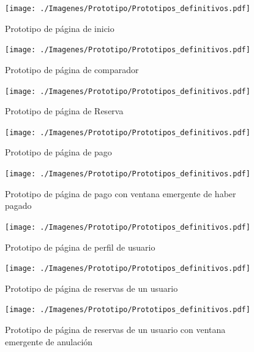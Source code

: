 \begin{figure}[H]
    \centering
    \texttt{[image: ./Imagenes/Prototipo/Prototipos\_definitivos.pdf]}
    \label{fig:prot_inicio}
    \caption{Prototipo de página de inicio}
\end{figure}

\begin{figure}[H]
    \centering
    \texttt{[image: ./Imagenes/Prototipo/Prototipos\_definitivos.pdf]}
    \label{fig:prot_comp}
    \caption{Prototipo de página de comparador}
\end{figure}

\begin{figure}[H]
    \centering
    \texttt{[image: ./Imagenes/Prototipo/Prototipos\_definitivos.pdf]}
    \label{fig:prot_reser}
    \caption{Prototipo de página de Reserva}
\end{figure}

\begin{figure}[H]
    \centering
    \texttt{[image: ./Imagenes/Prototipo/Prototipos\_definitivos.pdf]}
    \label{fig:prot_pago}
    \caption{Prototipo de página de pago}
\end{figure}

\begin{figure}[H]
    \centering
    \texttt{[image: ./Imagenes/Prototipo/Prototipos\_definitivos.pdf]}
    \label{fig:prot_pago_popup}
    \caption{Prototipo de página de pago con ventana emergente de haber pagado}
\end{figure}

\begin{figure}[H]
    \centering
    \texttt{[image: ./Imagenes/Prototipo/Prototipos\_definitivos.pdf]}
    \label{fig:prot_perfil}
    \caption{Prototipo de página de perfil de usuario}
\end{figure}

\begin{figure}[H]
    \centering
    \texttt{[image: ./Imagenes/Prototipo/Prototipos\_definitivos.pdf]}
    \label{fig:prot_reservas_usuario}
    \caption{Prototipo de página de reservas de un usuario}
\end{figure}

\begin{figure}[H]
    \centering
    \texttt{[image: ./Imagenes/Prototipo/Prototipos\_definitivos.pdf]}
    \label{fig:prot_reservas_usuario_popup}
    \caption{Prototipo de página de reservas de un usuario con ventana emergente de anulación}
\end{figure}


